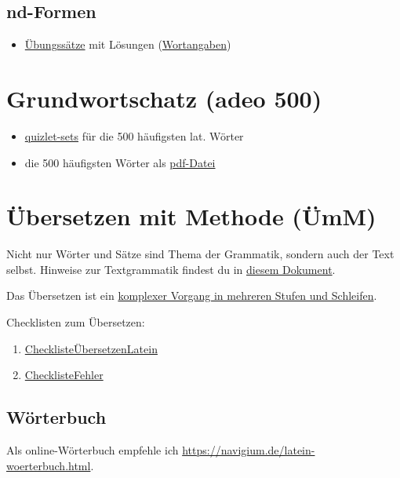 \documentclass{scrartcl}
\begin{document}
\subsection{nd-Formen}
\label{sec:org73c2697}

\begin{itemize}
\item \href{https://www.dropbox.com/s/ykmw8sncd4x5gly/nd-Formen\_Rep.pdf?dl=0}{Übungssätze} mit Lösungen (\href{https://www.dropbox.com/s/psg50w3n8azfi13/Wortangaben\_nd-Formen.pdf?dl=0}{Wortangaben})
\end{itemize}

\section{Grundwortschatz (adeo 500)}
\label{sec:orgebc6d79}
\begin{itemize}
\item \href{https://quizlet.com/class/1319955/}{quizlet-sets} für die 500 häufigsten lat. Wörter
\item die 500 häufigsten Wörter als \href{https://www.dropbox.com/s/v7m335rmadbrobt/500vocabula.pdf?dl=0}{pdf-Datei}
\end{itemize}

\section{Übersetzen mit Methode (ÜmM)}
\label{sec:orgac124fa}
Nicht nur Wörter und Sätze sind Thema der Grammatik, sondern auch der Text selbst. Hinweise zur Textgrammatik findest du in \href{https://www.dropbox.com/s/fbswvhejksw6kl6/pronomina.pdf?dl=0}{diesem Dokument}.

Das Übersetzen ist ein \href{https://www.dropbox.com/s/sj3ao2p098tt7ie/\%C3\%9Cbersetzen.pdf?dl=0}{komplexer Vorgang in mehreren Stufen und Schleifen}.

Checklisten zum Übersetzen:
\begin{enumerate}
\item \href{https://www.dropbox.com/s/r5je01sv9uulkzz/Checkliste\%C3\%9CbersetzenLatein.pdf?dl=0}{ChecklisteÜbersetzenLatein}
\item \href{https://www.dropbox.com/s/3g9uftxb833bqau/ChecklisteFehler.pdf?dl=0}{ChecklisteFehler}
\end{enumerate}

\subsection{Wörterbuch}
\label{sec:orga75d02c}
Als online-Wörterbuch empfehle ich \url{https://navigium.de/latein-woerterbuch.html}.
\end{document}
